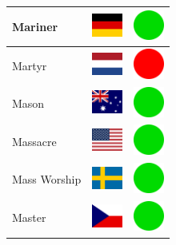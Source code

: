 \documentclass[12pt, a4paper, twoside]{report}
\begin{document}
\begin{center}
\begin{longtable}{|p{5cm}|p{2cm}|p{2cm}|}
 Mariner                                                    & \includegraphics[width=1cm]{../img/flags/de} &   \includegraphics[width=1cm]{../likes/y} \\ \hline
 Martyr                                                     & \includegraphics[width=1cm]{../img/flags/nl} &   \includegraphics[width=1cm]{../likes/n} \\ \hline
 Mason                                                      & \includegraphics[width=1cm]{../img/flags/au} &   \includegraphics[width=1cm]{../likes/y} \\ \hline
 Massacre                                                   & \includegraphics[width=1cm]{../img/flags/us} &   \includegraphics[width=1cm]{../likes/y} \\ \hline
 Mass Worship                                               & \includegraphics[width=1cm]{../img/flags/se} &   \includegraphics[width=1cm]{../likes/y} \\ \hline
 Master                                                     & \includegraphics[width=1cm]{../img/flags/cz} &   \includegraphics[width=1cm]{../likes/y} \\ \hline

\end{longtable}
\end{center}
\end{document}
